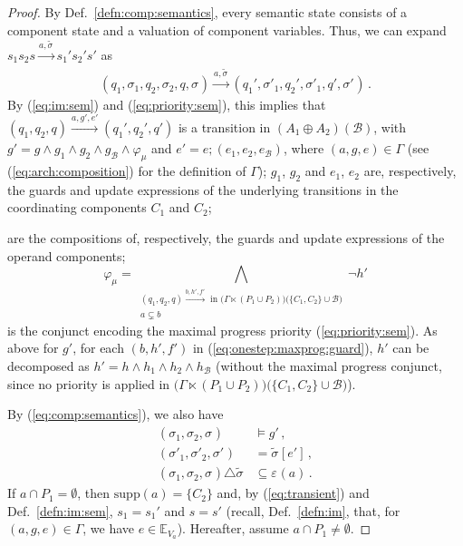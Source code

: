 \documentclass{llncs}
\newcommand{\defn}[1]{Def.~\ref{defn:#1}}
\newcommand{\eq}[1]{(\ref{eq:#1})}
\newcommand{\cB}{\ensuremath{\mathcal{B}}}
\newcommand{\sE}{\ensuremath{\mathbb{E}}}
\newcommand{\goesto}[2][]{\ensuremath{\xrightarrow[#1]{#2}}}
\newcommand{\exprs}[1]{\ensuremath{\sE_{#1}}}
\newcommand{\val}[3][]{\ensuremath{#1{\sigma}^{#2}_{#3}}}
\newcommand{\primeit}[1]{#1'}
\newcommand{\export}[1][]{\ensuremath{\varepsilon_{#1}}}
\newcommand{\valdiff}[2]{\ensuremath{#1 \triangle #2}}
\newcommand{\supp}[1]{\ensuremath{\mathrm{supp}(#1)}}
\newcommand{\IMextend}[2]{\ensuremath{#1 \ltimes #2}}
\newcommand{\arcomp}{\oplus}
\begin{document}
\begin{proof}
  By \defn{comp:semantics}, every semantic state consists of a
  component state and a valuation of component variables.  Thus,
  we can expand $s_1 s_2 s \goesto{a, \tilde{\val{}{}}} s_1' s_2' s'$
  as
%
  \[
  (q_1, \val{}{1}, q_2, \val{}{2}, q, \val{}{})
%
  \goesto{a, \tilde{\val{}{}}}
%
  (q_1', \val[\primeit]{}{1}, q_2', \val[\primeit]{}{1}, q', \val[\primeit]{}{})
  \,.
  \]
%
  By \eq{im:sem} and \eq{priority:sem}, this implies
  that
  $(q_1, q_2, q) \goesto {a, g', e'} (q_1', q_2', q')$
  is a transition in $(A_1 \arcomp A_2)(\cB)$, with
%
  $g' = g \land g_1 \land g_2 \land g_\cB \land \varphi_\mu$
  and
  $e' = e; (e_1, e_2, e_\cB)$,
  where $(a, g, e) \in \Gamma$ (see \eq{arch:composition} for the
  definition of $\Gamma$);
%  
  $g_1$, $g_2$ and $e_1$, $e_2$ are, respectively, the guards and
  update expressions of the underlying transitions in the coordinating
  components $C_1$ and $C_2$;
%    
%
  are the compositions of, respectively, the guards and update
  expressions of the operand components;
%    
  \begin{equation}
    \label{eq:onestep:maxprog:guard}
    \varphi_\mu = \bigwedge_{
      \begin{array}{c}
        (q_1, q_2, q) \goesto{b, h', f'} \text{ in }
        \bigl(\IMextend{\Gamma}{(P_1 \cup P_2)}\bigr)
        \bigl(\{C_1, C_2\} \cup \cB\bigr)
        \\
        a \varsubsetneq b
      \end{array}
    } \lnot h'
  \end{equation}
%
  is the conjunct encoding the maximal progress priority
  \eq{priority:sem}.  As above for $g'$, for each $(b, h', f')$ in
  \eq{onestep:maxprog:guard}, $h'$ can be decomposed as $h' = h \land
  h_1 \land h_2 \land h_\cB$ (without the maximal progress conjunct,
  since no priority is applied in $\bigl(\IMextend{\Gamma}{(P_1 \cup
    P_2)}\bigr)\bigl(\{C_1, C_2\} \cup \cB\bigr)$).
  
  By \eq{comp:semantics}, we also have
%
  \begin{align}
    \label{eq:guard}
    (\val{}{1}, \val{}{2}, \val{}{}) &\models g'
    \,,
    \\
    \label{eq:substitution}
    (\val[\primeit]{}{1}, \val[\primeit]{}{2}, \val[\primeit]{}{})
    &= \val[\tilde]{}{}[e']
    \,,
    \\
    \label{eq:transient}
    \valdiff{(\val{}{1}, \val{}{2}, \val{}{})}{\val[\tilde]{}{}}
    &\subseteq \export(a)
    \,.
  \end{align}
%
  If $a \cap P_1 = \emptyset$, then $\supp{a} = \{C_2\}$ and, by
  \eq{transient} and \defn{im:sem}, $s_1 = s_1'$ and $s = s'$
  (recall, \defn{im}, that, for $(a,g,e) \in \Gamma$, we have $e
  \in \exprs{V_a}$).  Hereafter, assume $a \cap P_1 \neq
  \emptyset$.


\end{proof}
\end{document}

